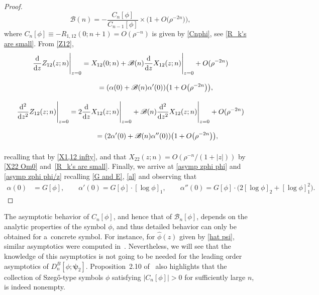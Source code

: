 \documentclass[10pt,a4paper]{amsart}
\numberwithin{equation}{section}
\newcommand{\al}{\alpha}
\newcommand{\dd}{{\rm d}}
\begin{document}
\begin{proof}
			\begin{equation}\label{BBB}
				\mathscr{B}(n) = - \frac{C_n[\phi]}{C_{n-1}[\phi]} \times \big(1 + O\big(\rho^{-2n}\big)\big),
			\end{equation}
			where $	C_n[\phi] \equiv -R_{1,12}(0;n+1) = O(\rho^{-n})$ is given by \eqref{Cnphi},
			see \eqref{R_k's are small}. From \eqref{Z12},
			\begin{gather*}
				\frac{\dd}{\dd z}Z_{12}(z;n) \Bigg|_{z=0} = X_{12}(0;n) + \mathscr{B}(n) 				\frac{\dd}{\dd z}X_{12}(z;n) \Bigg|_{z=0} + O(\rho^{-2n}) \\
\phantom{\frac{\dd}{\dd z}Z_{12}(z;n) \Bigg|_{z=0}}{} = ( \al(0) + \mathscr{B}(n) \al'(0) ) \big(1+ O\big(\rho^{-2n}\big)\big), \\
				\frac{\dd^2}{\dd z^2}Z_{12}(z;n) \Bigg|_{z=0} =2\frac{\dd}{\dd z}X_{12}(z;n) \Bigg|_{z=0} + \mathscr{B}(n) 				\frac{\dd^2}{\dd z^2}X_{12}(z;n) \Bigg|_{z=0} + O(\rho^{-2n}) \\
 \phantom{\frac{\dd^2}{\dd z^2}Z_{12}(z;n) \Bigg|_{z=0}}{}= ( 2\al'(0) + \mathscr{B}(n) \al''(0) ) \big(1+ O\big(\rho^{-2n}\big)\big),
			\end{gather*}
			recalling that  by \eqref{X1,12 infty}, and that $X_{22}(z;n) = O(\rho^{-n}/(1+|z|))$ by \eqref{X22 Om0} and~\eqref{R_k's are small}. Finally, we arrive at \eqref{asymp zphi phi} and \eqref{asymp zphi phi/z} recalling \eqref{G and E}, \eqref{al} and observing that
			\begin{align*}
				\al(0) & = G[\phi], \qquad
				\al'(0) = G[\phi] \cdot [\log \phi]_1, \qquad
				\al''(0) = G[\phi] \cdot \big( 2 [\log \phi]_2 + [\log \phi]^2_1 \big).	\tag*{\qed}			
			\end{align*}\renewcommand{\qed}{}
		\end{proof}

\begin{Remark}
The asymptotic behavior of $C_n[\phi]$, and hence that of $\mathscr{B}_n[\phi]$, depends on the analytic properties of the symbol $\phi$, and thus detailed behavior can only be obtained for a~concrete symbol. For instance, for $\widehat{\phi}(z)$ given by \eqref{hat psi}, similar asymptotics were computed in~\cite[Proposition~2.10]{BEGIL}. Nevertheless, we will see that the knowledge of this asymptotics is not going to be needed for the leading order asymptotics of $D^B_n[\phi;\boldsymbol{\psi}_2]$. Proposition~2.10 of~\cite{BEGIL} also highlights that the collection of Szeg\H{o}-type symbols $\phi$ satisfying $|C_n[\phi]|>0$ for sufficiently large $n$, is indeed nonempty.
\end{Remark}
		
\end{document}
